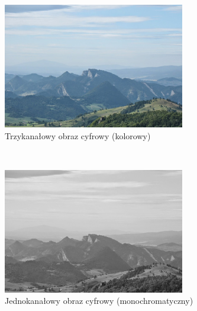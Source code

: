 \begin{figure}
  \centering
  \begin{subfigure}[b]{0.45\textwidth}
    \includegraphics[width=\textwidth]{img/basics-image-color}
    \caption{Trzykanałowy obraz cyfrowy (kolorowy)}
    \label{fig:basics_image_color}
  \end{subfigure}
  ~
  \begin{subfigure}[b]{0.45\textwidth}
    \includegraphics[width=\textwidth]{img/basics-image-gray}
    \caption{Jednokanałowy obraz cyfrowy (monochromatyczny)}
    \label{fig:basics_image_gray}
  \end{subfigure}
  ~
  \begin{subfigure}[b]{0.45\textwidth}

\end{subfigure}
\end{figure}
